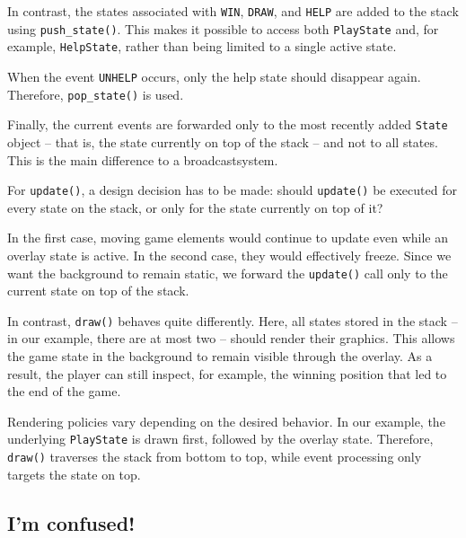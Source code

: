In contrast, the states associated with \texttt{WIN}, \texttt{DRAW}, and \texttt{HELP} are added to the stack using \texttt{push\_state()}. This makes it possible to access both \texttt{PlayState} and, for example, \texttt{HelpState}, rather than being limited to a single active state.

When the event \texttt{UNHELP} occurs, only the help state should disappear again. Therefore, \texttt{pop\_state()} is used.

\begin{hintbox}
	Finally, the current events are forwarded only to the most recently added \texttt{State} object -- that is, the state currently on top of the stack -- and not to all states. This is the main difference to a \gls{broadcastsystem}.
\end{hintbox}


For \texttt{update()}, a design decision has to be made: should \texttt{update()} be executed for every state on the stack, or only for the state currently on top of it?

In the first case, moving game elements would continue to update even while an overlay state is active. In the second case, they would effectively freeze. Since we want the background to remain static, we forward the \texttt{update()} call only to the current state on top of the stack.

In contrast, \texttt{draw()} behaves quite differently. Here, all states stored in the stack -- in our example, there are at most two -- should render their graphics. This allows the game state in the background to remain visible through the overlay. As a result, the player can still inspect, for example, the winning position that led to the end of the game.

Rendering policies vary depending on the desired behavior. In our example, the underlying \texttt{PlayState} is drawn first, followed by the overlay state. Therefore, \texttt{draw()} traverses the stack from bottom to top, while event processing only targets the state on top.


\subsection{I'm confused!}


